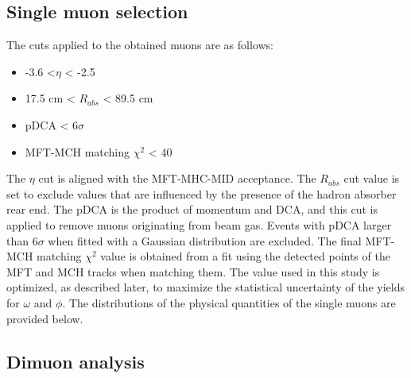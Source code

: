     \subsection{Single muon selection}
    \label{Single_muon_selection}
        The cuts applied to the obtained muons are as follows:
        \begin{itemize}{}
            \item -3.6 <$\eta$ < -2.5
            \item 17.5 cm < $R_{abs}$ < 89.5 cm
            \item pDCA < 6$\sigma$
            \item MFT-MCH matching $\chi^2$ < 40
        \end{itemize}
        The $\eta$ cut is aligned with the MFT-MHC-MID acceptance. The $R_{abs}$ cut value is set to exclude values that are influenced by the presence of the hadron absorber rear end. The pDCA is the product of momentum and DCA, and this cut is applied to remove muons originating from beam gas. Events with pDCA larger than 6$\sigma$ when fitted with a Gaussian distribution are excluded. 
        The final MFT-MCH matching $\chi^2$ value is obtained from a fit using the detected points of the MFT and MCH tracks when matching them. The value used in this study is optimized, as described later, to maximize the statistical uncertainty of the yields for $\omega$ and $\phi$. The distributions of the physical quantities of the single muons are provided below.
    
        \subsection{Dimuon analysis}
        \label{Dimuon}
